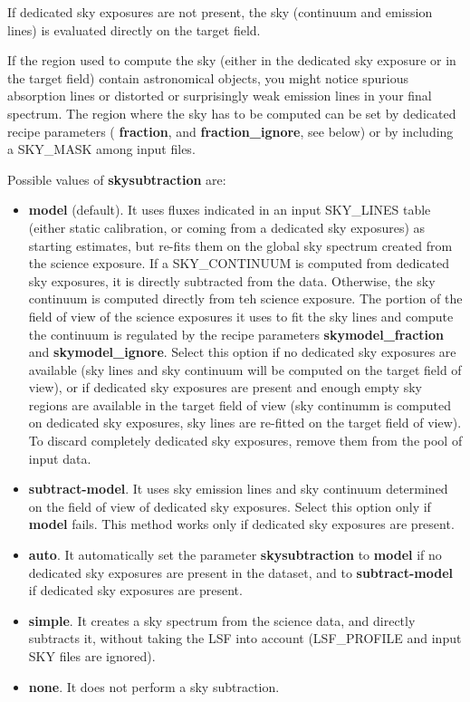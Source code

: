 If dedicated sky exposures are not present, the sky (continuum and
emission lines) is evaluated directly on the target field.


If the region used to compute the sky (either in the dedicated sky
exposure or in the target field) contain astronomical objects, you
might notice spurious absorption lines or distorted or surprisingly
weak emission lines in your final spectrum.  The region where the sky
has to be computed can be set by dedicated recipe parameters ({\bf
  fraction}, and {\bf fraction\_ignore}, see below) or by including a
SKY\_MASK among input files.

Possible values of {\bf skysubtraction} are:
\begin{itemize}
  
\item {\bf model} (default). It uses fluxes indicated in an input
  SKY\_LINES table (either static calibration, or coming from a
  dedicated sky exposures) as starting estimates, but re-fits them on
  the global sky spectrum created from the science exposure. If a
  SKY\_CONTINUUM is computed from dedicated sky exposures, it is
  directly subtracted from the data. Otherwise, the sky continuum is
  computed directly from teh science exposure. The portion of the
  field of view of the science exposures it uses to fit the sky lines
  and compute the continuum is regulated by the recipe parameters {\bf
    skymodel\_fraction} and {\bf skymodel\_ignore}. Select this option
  if no dedicated sky exposures are available (sky lines and sky
  continuum will be computed on the target field of view), or if
  dedicated sky exposures are present and enough empty sky regions are
  available in the target field of view (sky continumm is computed on
  dedicated sky exposures, sky lines are re-fitted on the target field
  of view). To discard completely dedicated sky exposures, remove them
  from the pool of input data.

\item {\bf subtract-model}. It uses sky emission lines and sky
  continuum determined on the field of view of dedicated sky
  exposures. Select this option only if {\bf model} fails. This method
  works only if dedicated sky exposures are present.

\item {\bf auto}. It automatically set the parameter {\bf
  skysubtraction} to {\bf model} if no dedicated sky exposures are
  present in the dataset, and to {\bf subtract-model} if dedicated sky
  exposures are present.

\item {\bf simple}. It creates a sky spectrum from the science data,
  and directly subtracts it, without taking the LSF into account
  (LSF\_PROFILE and input SKY files are ignored).

\item {\bf none}. It does not perform a sky subtraction.
\end{itemize}


